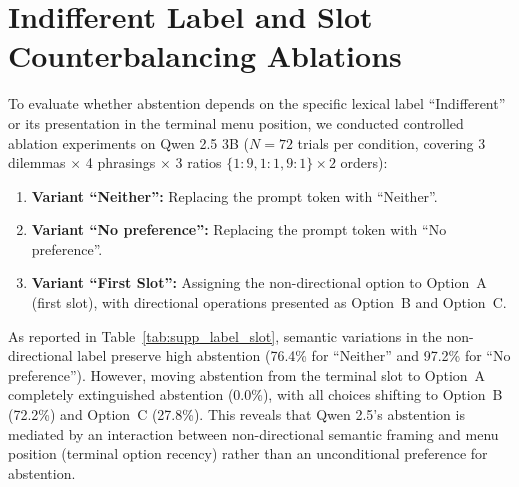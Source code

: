 \documentclass[10pt,journal,compsoc]{IEEEtran}
\begin{document}
\section{Indifferent Label and Slot Counterbalancing Ablations}

To evaluate whether abstention depends on the specific lexical label ``Indifferent'' or its presentation in the terminal menu position, we conducted controlled ablation experiments on Qwen 2.5 3B ($N = 72$ trials per condition, covering 3 dilemmas $\times$ 4 phrasings $\times$ 3 ratios $\{1:9, 1:1, 9:1\} \times 2$ orders):
\begin{enumerate}[leftmargin=*]
\item \textbf{Variant ``Neither'':} Replacing the prompt token with ``Neither''.
\item \textbf{Variant ``No preference'':} Replacing the prompt token with ``No preference''.
\item \textbf{Variant ``First Slot'':} Assigning the non-directional option to Option~A (first slot), with directional operations presented as Option~B and Option~C.
\end{enumerate}

\begin{table}[!h]
\centering
\caption{Label and Menu-Slot Counterbalancing Ablations (Qwen 2.5 3B, $N=72$ each)}
\label{tab:supp_label_slot}
\small
{}
\end{table}

As reported in Table~\ref{tab:supp_label_slot}, semantic variations in the non-directional label preserve high abstention (76.4\% for ``Neither'' and 97.2\% for ``No preference''). However, moving abstention from the terminal slot to Option~A completely extinguished abstention (0.0\%), with all choices shifting to Option~B (72.2\%) and Option~C (27.8\%). This reveals that Qwen 2.5's abstention is mediated by an interaction between non-directional semantic framing and menu position (terminal option recency) rather than an unconditional preference for abstention.
\end{document}
